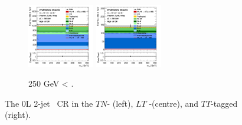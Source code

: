 \begin{figure}[h!]
\begin{subfigure}[b]{\textwidth}
        \includegraphics[width=0.32\textwidth]{Images/VH/Own_fit/postfit_VHcc/Region_distmBB_BMin250_DCRHigh_J2_TTypelt_T2_L0_Y6051_GlobalFit_conditionnal_mu1.png}
        \includegraphics[width=0.32\textwidth]{Images/VH/Own_fit/postfit_VHcc/Region_distmBB_BMin250_DCRHigh_J2_TTypett_T2_L0_Y6051_GlobalFit_conditionnal_mu1.png}
        \caption{250 GeV < \ptv.}
        \label{fig:plots_VHcc_OL_250_CRH_2c_2J}
    \end{subfigure}
    \caption{The 0L 2-jet \highdr\ CR in the $TN$- (left), $LT$ -(centre), and $TT$-tagged (right).}
    \label{fig:plots_VHcc_OL_CRH_2c_2J}
\end{figure} 

